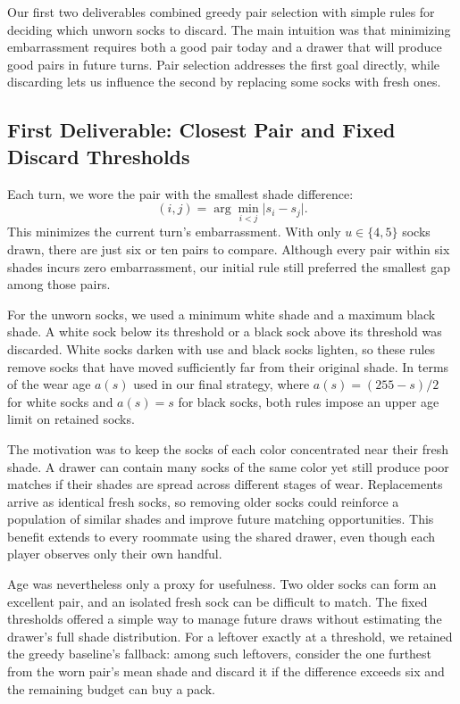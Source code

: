 \documentclass[11pt]{article}
\begin{document}
Our first two deliverables combined greedy pair selection with simple rules for deciding which unworn socks to discard. The main intuition was that minimizing embarrassment requires both a good pair today and a drawer that will produce good pairs in future turns. Pair selection addresses the first goal directly, while discarding lets us influence the second by replacing some socks with fresh ones.

\subsection{First Deliverable: Closest Pair and Fixed Discard Thresholds}

Each turn, we wore the pair with the smallest shade difference:
\[
(i,j)=\arg\min_{i<j}\lvert s_i-s_j\rvert.
\]
This minimizes the current turn's embarrassment. With only \(u\in\{4,5\}\) socks drawn, there are just six or ten pairs to compare. Although every pair within six shades incurs zero embarrassment, our initial rule still preferred the smallest gap among those pairs.

For the unworn socks, we used a minimum white shade and a maximum black shade. A white sock below its threshold or a black sock above its threshold was discarded. White socks darken with use and black socks lighten, so these rules remove socks that have moved sufficiently far from their original shade. In terms of the wear age \(a(s)\) used in our final strategy, where \(a(s)=(255-s)/2\) for white socks and \(a(s)=s\) for black socks, both rules impose an upper age limit on retained socks.

The motivation was to keep the socks of each color concentrated near their fresh shade. A drawer can contain many socks of the same color yet still produce poor matches if their shades are spread across different stages of wear. Replacements arrive as identical fresh socks, so removing older socks could reinforce a population of similar shades and improve future matching opportunities. This benefit extends to every roommate using the shared drawer, even though each player observes only their own handful.

Age was nevertheless only a proxy for usefulness. Two older socks can form an excellent pair, and an isolated fresh sock can be difficult to match. The fixed thresholds offered a simple way to manage future draws without estimating the drawer's full shade distribution. For a leftover exactly at a threshold, we retained the greedy baseline's fallback: among such leftovers, consider the one furthest from the worn pair's mean shade and discard it if the difference exceeds six and the remaining budget can buy a pack.
\end{document}
